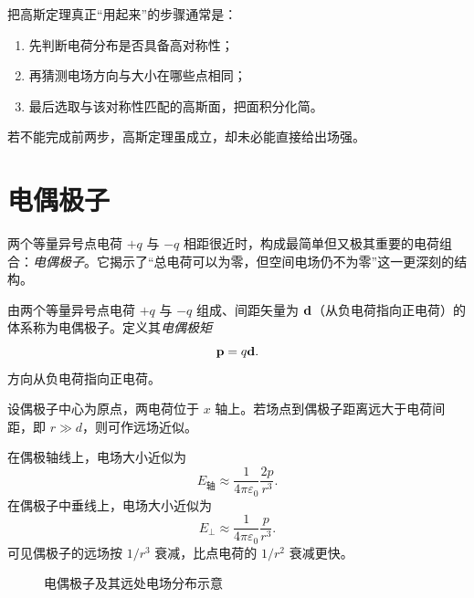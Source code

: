 \begin{remark}
把高斯定理真正“用起来”的步骤通常是：
\begin{enumerate}
  \item 先判断电荷分布是否具备高对称性；
  \item 再猜测电场方向与大小在哪些点相同；
  \item 最后选取与该对称性匹配的高斯面，把面积分化简。
\end{enumerate}
若不能完成前两步，高斯定理虽成立，却未必能直接给出场强。
\end{remark}

\section{电偶极子}

两个等量异号点电荷 $+q$ 与 $-q$ 相距很近时，构成最简单但又极其重要的电荷组合：\emph{电偶极子}。它揭示了“总电荷可以为零，但空间电场仍不为零”这一更深刻的结构。

\begin{definition}[电偶极子与电偶极矩]
由两个等量异号点电荷 $+q$ 与 $-q$ 组成、间距矢量为 $\vb{d}$（从负电荷指向正电荷）的体系称为电偶极子。定义其\emph{电偶极矩}
\begin{equation}
\vb{p} = q\vb{d}.
\end{equation}
方向从负电荷指向正电荷。
\end{definition}

设偶极子中心为原点，两电荷位于 $x$ 轴上。若场点到偶极子距离远大于电荷间距，即 $r\gg d$，则可作远场近似。

在偶极轴线上，电场大小近似为
\begin{equation}
E_{\text{轴}} \approx \frac{1}{4\pi\varepsilon_0}\frac{2p}{r^3}.
\end{equation}
在偶极子中垂线上，电场大小近似为
\begin{equation}
E_{\perp} \approx \frac{1}{4\pi\varepsilon_0}\frac{p}{r^3}.
\end{equation}
可见偶极子的远场按 $1/r^3$ 衰减，比点电荷的 $1/r^2$ 衰减更快。

\begin{figure}[H]
\centering
{}
\caption{电偶极子及其远处电场分布示意}
\end{figure}

